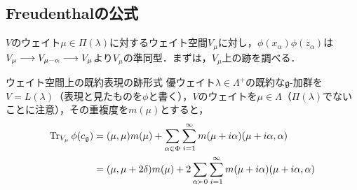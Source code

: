 \documentclass[rep_main]{subfiles}
\begin{document}
\subsection{Freudenthalの公式}
$V$のウェイト$\mu \in \Pi(\lambda)$に対するウェイト空間$V_\mu$に対し，$\phi(x_\alpha)\phi(z_\alpha)$は$V_\mu \longrightarrow V_{\mu - \alpha} \longrightarrow V_\mu$より$V_\mu$の準同型．まずは，$V_\mu$上の跡を調べる．
\begin{mylem}[label=lem:Freudenthal]{ウェイト空間上の既約表現の跡形式}
	優ウェイト$\lambda \in \Lambda^+$の既約な$\mathfrak{g}$-加群を$V = L(\lambda)$（表現と見たものを$\phi$と書く），$V$のウェイトを$\mu \in \Lambda$（$\Pi(\lambda)$でないことに注意），その重複度を$m(\mu)$とすると，
	\begin{align}
		\Tr_{V_\mu} \phi(c_\mathfrak{g}) &= (\mu, \mu)m(\mu) + \sum_{\alpha \in \Phi} \sum_{i=1}^\infty m(\mu + i\alpha)(\mu + i\alpha, \alpha) \\
		&= (\mu, \mu + 2\delta)m(\mu) + 2\sum_{\alpha \succ 0} \sum_{i=1}^\infty m(\mu + i\alpha)(\mu + i\alpha, \alpha)
	\end{align}
\end{mylem}
\end{document}

